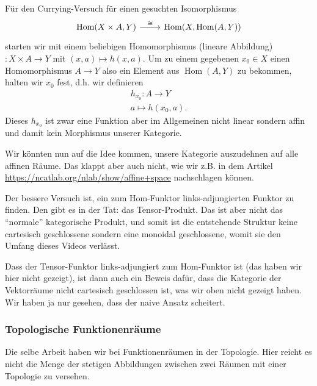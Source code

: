 \documentclass[a4paper]{amsart}
\theoremstyle{definition}
\DeclareMathOperator{\Hom}{Hom}
\begin{document}
Für den Currying-Versuch für einen gesuchten Isomorphismus
\begin{equation}
   \begin{tikzcd}
      \Hom(X \times A, Y ) \arrow[r, "\cong"]   
      & \Hom(X, \Hom( A, Y)) 
   \end{tikzcd}
\end{equation} 
starten wir mit einem beliebigen Homomorphismus (lineare Abbildung) 
$ \colon X \times A \to Y$ mit $(x,a) \mapsto h(x,a)$. Um zu einem gegebenen $x_0 \in X$ einen Homomorphismus $A \to Y$ also ein Element aus $\Hom( A, Y )$ zu bekommen, halten wir $x_0$ fest, d.h. wir definieren
\begin{align}
   h_{x_0} \colon A \to Y\\
   a \mapsto h( x_0, a ).
\end{align}
Dieses $h_{x_0}$ ist zwar eine Funktion aber im Allgemeinen nicht linear sondern affin und damit kein Morphismus unserer Kategorie.

Wir könnten nun auf die Idee kommen, unsere Kategorie auszudehnen auf alle affinen Räume. Das klappt aber auch nicht, wie wir z.B. in dem Artikel \url{https://ncatlab.org/nlab/show/affine+space} nachschlagen können.

Der bessere Versuch ist, ein zum Hom-Funktor links-adjungierten Funktor zu finden. Den gibt es in der Tat: das Tensor-Produkt. Das ist aber nicht das "`normale"' kategorische Produkt, und somit ist die entstehende Struktur keine cartesisch geschlossene sondern eine monoidal geschlossene, womit sie den Umfang dieses Videos verlässt.

Dass der Tensor-Funktor links-adjungiert zum Hom-Funktor ist (das haben wir hier nicht gezeigt), ist dann auch ein Beweis dafür, dass die Kategorie der Vektorräume nicht cartesisch geschlossen ist, was wir oben nicht gezeigt haben. Wir haben ja nur gesehen, dass der naive Ansatz scheitert.

\subsubsection{Topologische Funktionenräume}
Die selbe Arbeit haben wir bei Funktionenräumen in der Topologie. Hier reicht es nicht die Menge der stetigen Abbildungen zwischen zwei Räumen mit einer Topologie zu versehen.

\end{document}
